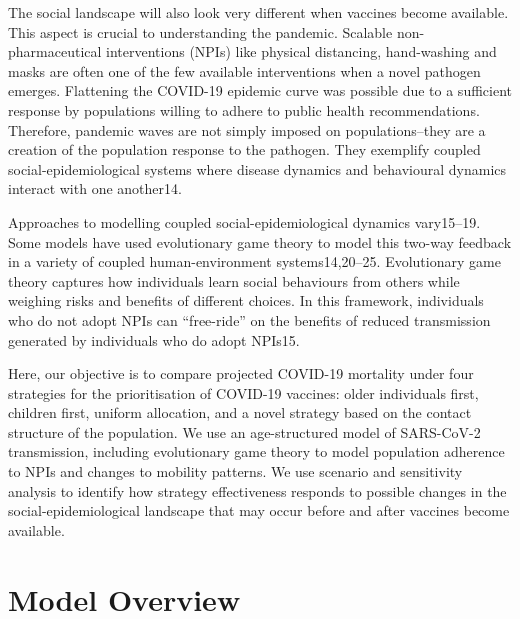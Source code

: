 The social landscape will also look very different when vaccines become available. This aspect is crucial to understanding the pandemic. Scalable non-pharmaceutical interventions (NPIs) like physical distancing, hand-washing and masks are often one of the few available interventions when a novel pathogen emerges.  Flattening the COVID-19 epidemic curve was possible due to a sufficient response by populations willing to adhere to public health recommendations.  Therefore, pandemic waves are not simply imposed on populations--they are a creation of the population response to the pathogen. They exemplify coupled social-epidemiological systems where disease dynamics and behavioural dynamics interact with one another14. 

Approaches to modelling coupled social-epidemiological dynamics vary15–19.  Some models have used evolutionary game theory to model this two-way feedback in a variety of coupled human-environment systems14,20–25.  Evolutionary game theory captures how individuals learn social behaviours from others while weighing risks and benefits of different choices. In this framework, individuals who do not adopt NPIs can “free-ride” on the benefits of reduced transmission generated by individuals who do adopt NPIs15. 

Here, our objective is to compare projected COVID-19 mortality under four strategies for the prioritisation of COVID-19 vaccines: older individuals first, children first, uniform allocation, and a novel strategy based on the contact structure of the population. We use an age-structured model of SARS-CoV-2 transmission, including evolutionary game theory to model population adherence to NPIs and changes to mobility patterns.  We use scenario and sensitivity analysis to identify how strategy effectiveness responds to possible changes in the social-epidemiological landscape that may occur before and after vaccines become available.  

\section{Model Overview}

